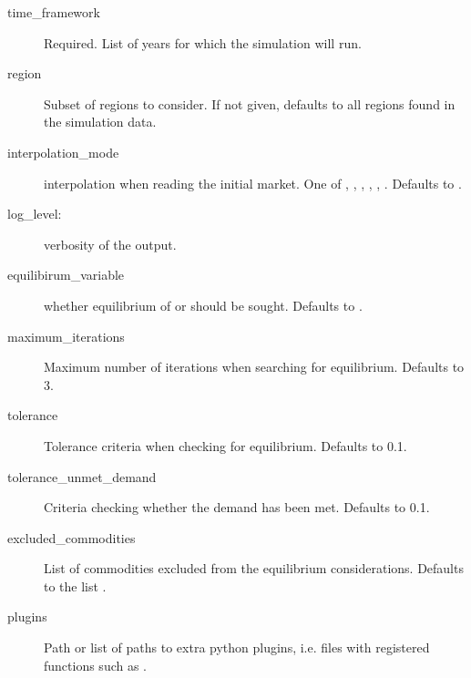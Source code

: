 \documentclass[letterpaper,10pt,english]{sphinxmanual}
\begin{document}
\begin{sphinxVerbatim}[commandchars=\\\{\}]
  
  
  
  

  
  
  
  
\end{sphinxVerbatim}
\begin{description}
\item[{time\_framework}] \leavevmode
Required. List of years for which the simulation will run.

\item[{region}] \leavevmode
Subset of regions to consider. If not given, defaults to all regions found in the
simulation data.

\item[{interpolation\_mode}] \leavevmode
interpolation when reading the initial market. One of
, , , , , . Defaults to .

\item[{log\_level:}] \leavevmode
verbosity of the output.

\item[{equilibirum\_variable}] \leavevmode
whether equilibrium of  or  should be sought. Defaults to .

\item[{maximum\_iterations}] \leavevmode
Maximum number of iterations when searching for equilibrium. Defaults to 3.

\item[{tolerance}] \leavevmode
Tolerance criteria when checking for equilibrium. Defaults to 0.1.

\item[{tolerance\_unmet\_demand}] \leavevmode
Criteria checking whether the demand has been met.  Defaults to \sphinxhyphen{}0.1.

\item[{excluded\_commodities}] \leavevmode
List of commodities excluded from the equilibrium considerations. Defaults to the
list .

\item[{plugins}] \leavevmode
Path or list of paths to extra python plugins, i.e. files with registered functions
such as .

\end{description}
\end{document}
